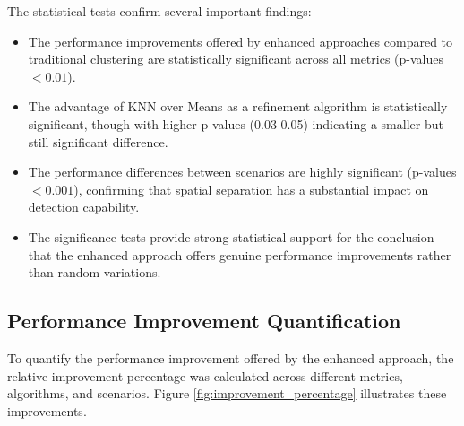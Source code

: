 The statistical tests confirm several important findings:

\begin{itemize}
    \item The performance improvements offered by enhanced approaches compared to traditional clustering are statistically significant across all metrics (p-values $< 0.01$).
    
    \item The advantage of KNN over Means as a refinement algorithm is statistically significant, though with higher p-values (0.03-0.05) indicating a smaller but still significant difference.
    
    \item The performance differences between scenarios are highly significant (p-values $< 0.001$), confirming that spatial separation has a substantial impact on detection capability.
    
    \item The significance tests provide strong statistical support for the conclusion that the enhanced approach offers genuine performance improvements rather than random variations.
\end{itemize}

\subsection{Performance Improvement Quantification}

To quantify the performance improvement offered by the enhanced approach, the relative improvement percentage was calculated across different metrics, algorithms, and scenarios. Figure \ref{fig:improvement_percentage} illustrates these improvements.

